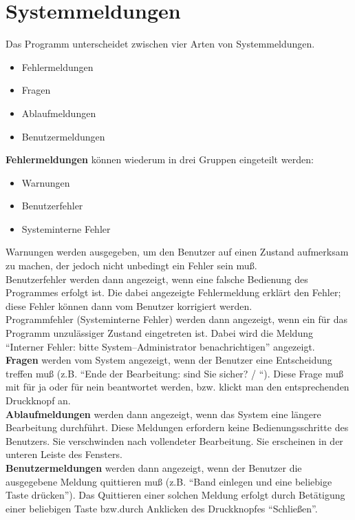 \section{Systemmeldungen} 
  

Das Programm unterscheidet zwischen vier Arten von Systemmeldungen.
\begin{itemize}
\item Fehlermeldungen
\item Fragen
\item Ablaufmeldungen
\item Benutzermeldungen
\end{itemize}

{\bf Fehlermeldungen}  k\"{o}nnen wiederum in drei Gruppen
eingeteilt werden:

\begin{itemize}
\item Warnungen
\item Benutzerfehler
\item Systeminterne Fehler
\end{itemize}

Warnungen werden ausgegeben, um den Benutzer auf einen Zustand
aufmerksam zu machen, der jedoch nicht unbedingt ein Fehler sein
mu{\ss}.\\
Benutzerfehler werden dann angezeigt, wenn eine falsche Bedienung
des Programmes erfolgt ist. Die dabei angezeigte Fehlermeldung erkl\"{a}rt
den Fehler; diese Fehler k\"{o}nnen dann vom Benutzer korrigiert werden.\\
Programmfehler (Systeminterne Fehler) werden dann angezeigt, wenn
ein f\"{u}r das Programm unzul\"{a}ssiger Zustand eingetreten ist. Dabei
wird die Meldung ``Interner Fehler: bitte System--Administrator benachrichtigen'' angezeigt.\\

{\bf Fragen}  werden vom System angezeigt, wenn der Benutzer eine
Entscheidung treffen mu{\ss} (z.B. ``Ende der Bearbeitung: sind Sie
sicher? / ``). Diese Frage mu{\ss} mit  f\"{u}r
ja oder  f\"{u}r nein beantwortet werden, bzw. klickt man den
entsprechenden Druckknopf an.\\

{\bf Ablaufmeldungen}
werden dann angezeigt, wenn das System eine l\"{a}ngere Bearbeitung
durchf\"{u}hrt. Diese Meldungen erfordern keine Bedienungsschritte des
Benutzers. Sie verschwinden nach vollendeter Bearbeitung. Sie erscheinen in der unteren Leiste des Fensters.\\

{\bf Benutzermeldungen} werden dann angezeigt, wenn der
Benutzer die ausgegebene Meldung quittieren mu{\ss} (z.B. ``Band
einlegen und eine beliebige Taste dr\"{u}cken''). Das Quittieren einer
solchen Meldung erfolgt durch Bet\"{a}tigung einer beliebigen Taste bzw.durch
Anklicken des Druckknopfes ``Schlie{\ss}en''.
